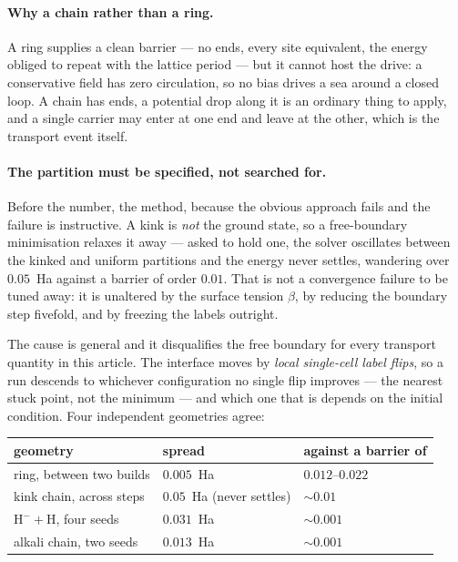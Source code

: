 \documentclass[11pt]{article}
\begin{document}
\paragraph{Why a chain rather than a ring.} A ring supplies a clean barrier --- no ends,
every site equivalent, the energy obliged to repeat with the lattice period --- but it cannot host
the drive: a conservative field has zero circulation, so no bias drives a sea around a closed loop.
A chain has ends, a potential drop along it is an ordinary thing to apply, and a single carrier may
enter at one end and leave at the other, which is the transport event itself.

\paragraph{The partition must be specified, not searched for.} Before the number, the method,
because the obvious approach fails and the failure is instructive. A kink is \emph{not} the ground
state, so a free-boundary minimisation relaxes it away --- asked to hold one, the solver oscillates
between the kinked and uniform partitions and the energy never settles, wandering over
$0.05$~Ha against a barrier of order $0.01$. That is not a convergence failure to be tuned away:
it is unaltered by the surface tension $\beta$, by reducing the boundary step fivefold, and by
freezing the labels outright.

The cause is general and it disqualifies the free boundary for every transport quantity in this
article. The interface moves by \emph{local single-cell label flips}, so a run descends to whichever
configuration no single flip improves --- the nearest stuck point, not the minimum --- and which one
that is depends on the initial condition. Four independent geometries agree:

\begin{center}
\small
\begin{tabular}{@{}lll@{}}
\toprule
geometry & spread & against a barrier of\\
\midrule
ring, between two builds & $0.005$~Ha & $0.012$--$0.022$\\
kink chain, across steps & $0.05$~Ha (never settles) & $\sim0.01$\\
$\mathrm{H}^-+\mathrm{H}$, four seeds & $0.031$~Ha & $\sim0.001$\\
alkali chain, two seeds & $0.013$~Ha & $\sim0.001$\\
\bottomrule
\end{tabular}
\end{center}
\end{document}
